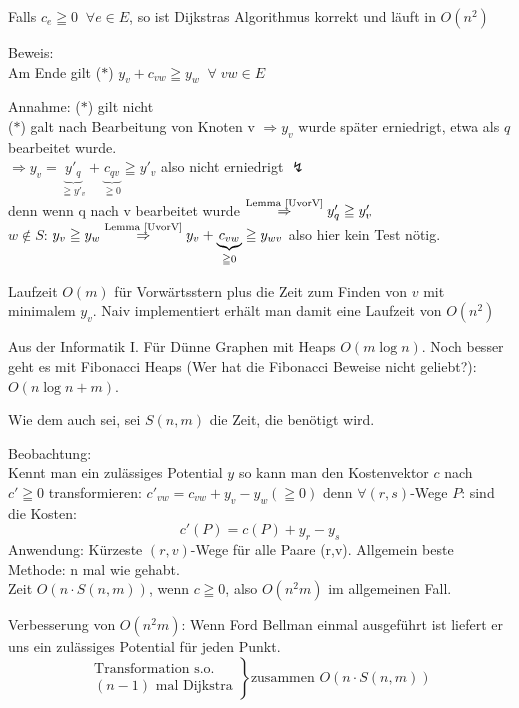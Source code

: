 \begin{satz}
Falls $c_{e} \geqq 0 \; \; \forall e \in E$, so ist Dijkstras Algorithmus
korrekt und läuft in $O(n^{2})$
\end{satz}

Beweis:\\
Am Ende gilt ($\ast$) $y_{v} + c_{v w} \geqq y_{w} \; \; \forall \; v w \in
E$

Annahme: ($\ast$) gilt nicht\\
($\ast$) galt nach Bearbeitung von Knoten v $\Rightarrow y_{v}$ wurde
später erniedrigt, etwa als $q$ bearbeitet wurde. \\
$\Rightarrow y_{v} = \underbrace{y'_{q}}_{\geqq y'_{v}} + \underbrace{c_{q v}}_{\geqq 0}  \geqq y'_{v}$ 
also nicht erniedrigt $\lightning$\\
denn wenn q nach v bearbeitet wurde $\stackrel{\mbox{\scriptsize Lemma
\ref{UvorV}}}{\Rightarrow} y'_{q} \geqq y'_{v}$\\
$w \not \in S$: $y_{v} \geqq y_{w} \stackrel{\mbox{\scriptsize Lemma
\ref{UvorV}}}{\Rightarrow} y_{v} + \underbrace{c_{v w}}_{\geqq 0} \geqq
y_{w v}$ also hier kein Test nötig. 

Laufzeit $O(m)$ für Vorwärtsstern plus die Zeit zum Finden von $v$ mit
minimalem $y_{v}$. Naiv implementiert erhält man damit eine Laufzeit von
$O(n^{2})$

Aus der Informatik I. Für Dünne Graphen mit Heaps $O(m \log n)$. Noch besser
geht es mit Fibonacci Heaps (Wer hat die Fibonacci Beweise nicht geliebt?):
$O(n \log n + m)$.

Wie dem auch sei, sei $S(n,m)$ die Zeit, die benötigt wird.

Beobachtung:\\
Kennt man ein zulässiges Potential $y$ so kann man den Kostenvektor $c$
nach $c' \geqq 0$ transformieren: $c'_{v w} = c_{v w} + y_{v} - y_{w} (\geqq 0)$ 
denn  $\forall (r,s)$-Wege $P$: sind die Kosten: 
\[c'(P) = c(P) + y_{r} - y_{s}\]  
Anwendung: Kürzeste $(r,v)$-Wege für alle Paare (r,v). Allgemein beste
Methode: n mal wie gehabt.\\
Zeit $O(n \cdot S(n,m))$, wenn $c \geqq 0$, also $O(n^{2}m)$ im allgemeinen
Fall.

Verbesserung von $O(n^{2}m)$: Wenn Ford Bellman einmal ausgeführt ist
liefert er uns ein zulässiges Potential für jeden Punkt.
\[\left. \begin{array}{l}
\mbox{Transformation s.o.}\\
\mbox{$(n-1)$ mal Dijkstra}\end{array} \right\} \mbox{zusammen } O(n \cdot
S(n,m))
\]

